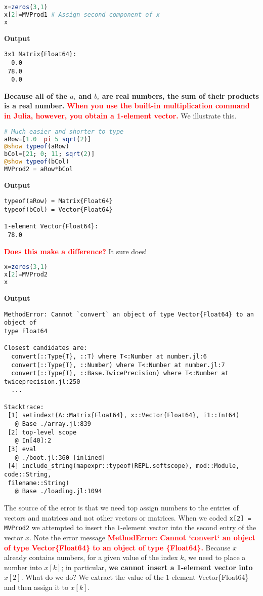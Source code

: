 \begin{lstlisting}[language=Julia,style=mystyle]
x=zeros(3,1)
x[2]=MVProd1 # Assign second component of x
x
\end{lstlisting}
\textbf{Output} 
\begin{verbatim}
3×1 Matrix{Float64}:
  0.0
 78.0
  0.0
\end{verbatim}

\textbf{Because all of the $a_i$ and $b_i$ are real numbers, the sum of their products is a real number.} \textcolor{red}{\bf When you use the built-in multiplication command in Julia, however, you obtain a 1-element vector.} We illustrate this.


\begin{lstlisting}[language=Julia,style=mystyle]
# Much easier and shorter to type
aRow=[1.0  pi 5 sqrt(2)]
@show typeof(aRow)
bCol=[21; 0; 11; sqrt(2)]
@show typeof(bCol)
MVProd2 = aRow*bCol
\end{lstlisting}
\textbf{Output} 
\begin{verbatim}
typeof(aRow) = Matrix{Float64}
typeof(bCol) = Vector{Float64}

1-element Vector{Float64}:
 78.0
\end{verbatim}

\textcolor{red}{\bf Does this make a difference? } It sure does!

\begin{lstlisting}[language=Julia,style=mystyle]
x=zeros(3,1)
x[2]=MVProd2
x
\end{lstlisting}
\textbf{Output} 
\begin{verbatim}
MethodError: Cannot `convert` an object of type Vector{Float64} to an object of 
type Float64

Closest candidates are:
  convert(::Type{T}, ::T) where T<:Number at number.jl:6
  convert(::Type{T}, ::Number) where T<:Number at number.jl:7
  convert(::Type{T}, ::Base.TwicePrecision) where T<:Number at twiceprecision.jl:250
  ...

Stacktrace:
 [1] setindex!(A::Matrix{Float64}, x::Vector{Float64}, i1::Int64)
   @ Base ./array.jl:839
 [2] top-level scope
   @ In[40]:2
 [3] eval
   @ ./boot.jl:360 [inlined]
 [4] include_string(mapexpr::typeof(REPL.softscope), mod::Module, code::String,
 filename::String)
   @ Base ./loading.jl:1094
\end{verbatim}

The source of the error is that we need top assign numbers to the entries of vectors and matrices and not other vectors or matrices. When we coded \texttt{x[2] = MVProd2} we attempted to insert the $1$-element vector into the second entry of the vector $x$. Note the error message \textcolor{red}{\bf MethodError: Cannot `convert` an object of type Vector\{Float64\} to an object of type \{Float64\}. } 
Because $x$ already contains numbers, for a given value of the index $k$, we need to place a number into $x[k]$; in particular, \textbf{we cannot insert a 1-element vector into $x[2]$}. What do we do? We extract the value of the $1$-element Vector\{Float64\} and then assign it to $x[k]$.

